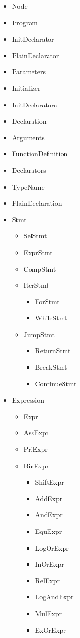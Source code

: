 \documentclass[nocopyrightspace]{sigplanconf}
\begin{document}
\begin{itemize}
	\item Node
	\item Program
	\item InitDeclarator
	\item PlainDeclarator
	\item Parameters
	\item Initializer
	\item InitDeclarators
	\item Declaration
	\item Arguments
	\item FunctionDefinition
	\item Declarators
	\item TypeName
	\item PlainDeclaration

	\item Stmt
	\begin{itemize}
		\item SelStmt
		\item ExprStmt
		\item CompStmt
		\item IterStmt
		\begin{itemize}
			\item ForStmt
			\item WhileStmt
		\end{itemize}
		\item JumpStmt
		\begin{itemize}
			\item ReturnStmt
			\item BreakStmt
			\item ContinueStmt
		\end{itemize}
	\end{itemize}


	\item Expression
	\begin{itemize}
		\item Expr
		\item AssExpr
		\item PriExpr

		\item BinExpr
		\begin{itemize}
			\item ShiftExpr
			\item AddExpr
			\item AndExpr
			\item EquExpr
			\item LogOrExpr
			\item InOrExpr
			\item RelExpr
			\item LogAndExpr
			\item MulExpr
			\item ExOrExpr
		\end{itemize}


\end{itemize}
\end{itemize}
\end{document}
